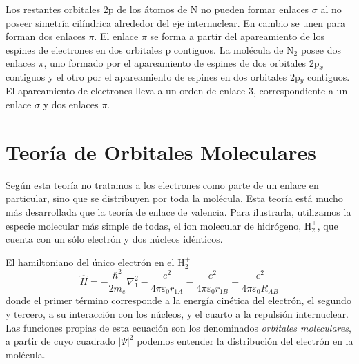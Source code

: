 Los restantes orbitales 2p de los átomos de N no pueden
formar enlaces $\sigma$ al no poseer simetría
cilíndrica alrededor del eje internuclear. En cambio se 
unen para forman dos enlaces $\pi$. El enlace $\pi$ se
forma a partir del apareamiento de los espines de 
electrones en dos orbitales p contiguos.
La molécula de N$_2$ posee dos enlaces $\pi$, uno formado
por el apareamiento de espines de dos orbitales 2p$_x$
contiguos y el otro por el apareamiento de espines en
dos orbitales 2p$_y$ contiguos. El apareamiento de
electrones lleva a un orden de enlace 3, correspondiente 
a un enlace $\sigma$ y dos enlaces $\pi$.


\section{Teoría de Orbitales Moleculares}
Según esta teoría no tratamos a los electrones como
parte de un enlace en particular, sino que se distribuyen
por toda la molécula. Esta teoría está mucho más desarrollada
que la teoría de enlace de valencia. Para ilustrarla,
utilizamos la especie molecular más simple de todas, el 
ion molecular de hidrógeno, H$^+_2$, que cuenta con un sólo
electrón y dos núcleos idénticos. 

El hamiltoniano del único electrón en el H$^+_2$
\begin{equation}
\hat{H}=-\frac{\hbar^2}{2m_e}\nabla^2_1-
\frac{e^2}{4\pi \varepsilon_0r_{1A}} - 
\frac{e^2}{4\pi \varepsilon_0r_{1B}} +
\frac{e^2}{4\pi \varepsilon_0R_{AB}}
\end{equation}
donde el primer término corresponde a la energía cinética
del electrón, el segundo y tercero, a su interacción 
con los núcleos, y el cuarto a la repulsión internuclear.
Las funciones propias de esta ecuación son los denominados
\textit{orbitales moleculares}, a partir de cuyo cuadrado
$|\Psi|^2$ podemos entender la distribución del electrón
en la molécula. 


